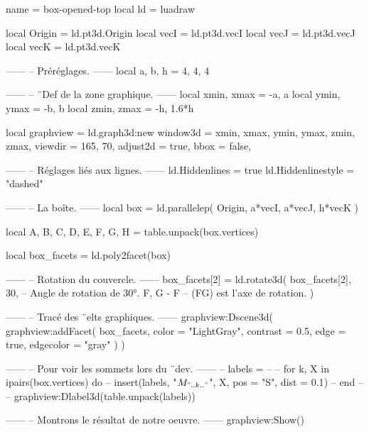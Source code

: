 \documentclass[border = 3pt]{standalone}
\begin{document}
\begin{luadraw*}{name = box-opened-top}
local ld = luadraw

local Origin = ld.pt3d.Origin
local vecI   = ld.pt3d.vecI
local vecJ   = ld.pt3d.vecJ
local vecK   = ld.pt3d.vecK

------
-- Préréglages.
------
local a, b, h = 4, 4, 4

------
-- ¨Def de la zone graphique.
------
local xmin, xmax = -a, a
local ymin, ymax = -b, b
local zmin, zmax = -h, 1.6*h

local graphview = ld.graph3d:new{
  window3d = {xmin, xmax, ymin, ymax, zmin, zmax},
  viewdir  = {165, 70},
  adjust2d = true,
  bbox     = false,
}

------
-- Réglages liés aux lignes.
------
ld.Hiddenlines     = true
ld.Hiddenlinestyle = "dashed"

------
-- La boîte.
------
local box = ld.parallelep(
  Origin,
  a*vecI, a*vecJ, h*vecK
)

local A, B, C, D, E, F, G, H = table.unpack(box.vertices)

local box_facets = ld.poly2facet(box)

------
-- Rotation du couvercle.
------
box_facets[2] = ld.rotate3d(
  box_facets[2],
  30,         -- Angle de rotation de 30°.
  {F, G - F}  -- (FG) est l'axe de rotation.
)

------
-- Tracé des ¨elts graphiques.
------
graphview:Dscene3d(
  graphview:addFacet(
    box_facets,
    {
      color     = "LightGray",
      contrast  = 0.5,
      edge      = true,
      edgecolor = "gray"
    }
  )
)

------
-- Pour voir les sommets lors du ¨dev.
------
-- labels = {}
--
-- for k, X in ipairs(box.vertices) do
--   insert(labels, {"$M_{".. k .."}$", X, {pos = "S", dist = 0.1}})
-- end
--
-- graphview:Dlabel3d(table.unpack(labels))

------
-- Montrons le résultat de notre oeuvre.
------
graphview:Show()
\end{luadraw*}
\end{document}
